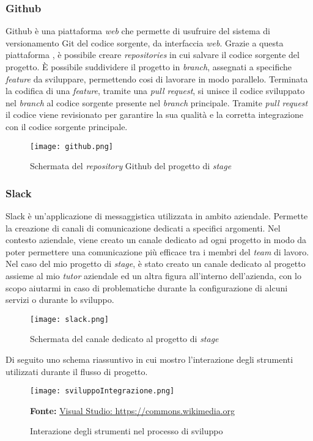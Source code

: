 \subsubsection{Github}
Github è una piattaforma \textit{web} che permette di usufruire del sistema di versionamento Git del codice sorgente, da interfaccia \textit{web}.
Grazie a questa piattaforma , è possibile creare \textit{repositories} in cui salvare il codice sorgente del progetto. 
È possibile suddividere il progetto in \textit{branch}, assegnati a specifiche \textit{feature} da sviluppare, permettendo cosi di lavorare in modo parallelo.
Terminata la codifica di una \textit{feature}, tramite una \textit{pull request}, si unisce il codice sviluppato nel \textit{branch} al codice sorgente presente nel \textit{branch} principale. Tramite \textit{pull request} il codice viene revisionato per garantire la sua qualità e la corretta integrazione con il codice sorgente principale.
\begin{figure}[H]
    \centering
    \texttt{[image: github.png]}
    \caption{Schermata del \textit{repository} Github del progetto di \textit{stage}}
    \label{fig:Github}
\end{figure}
\subsubsection{Slack}
Slack è un'applicazione di messaggistica utilizzata in ambito aziendale.
Permette la creazione di canali di comunicazione dedicati a specifici argomenti. Nel contesto aziendale, viene creato un canale dedicato ad ogni progetto in modo da poter permettere una comunicazione più efficace tra i membri del \textit{team} di lavoro.
Nel caso del mio progetto di \textit{stage}, è stato creato un canale dedicato al progetto assieme al mio \textit{tutor} aziendale ed un altra figura all'interno dell'azienda, con lo scopo aiutarmi in caso di problematiche durante la configurazione di alcuni servizi o durante lo sviluppo.
\begin{figure}[H]
    \centering
    \texttt{[image: slack.png]}
    \caption{Schermata del canale dedicato al progetto di \textit{stage}}
    \label{fig:Slack}
\end{figure}
\noindent
Di seguito uno schema riassuntivo in cui mostro l'interazione degli strumenti utilizzati durante il flusso di progetto.
\begin{figure}[H]
    \centering
    \texttt{[image: sviluppoIntegrazione.png]}
    \caption{Interazione degli strumenti nel processo di sviluppo}
    \small \textbf{Fonte:} \href{https://commons.wikimedia.org/wiki/File:Visual_Studio_Code_1.35_icon.svg}{Visual Studio: https://commons.wikimedia.org}

    \label{fig:sviluppoIntegrazione}
\end{figure}


